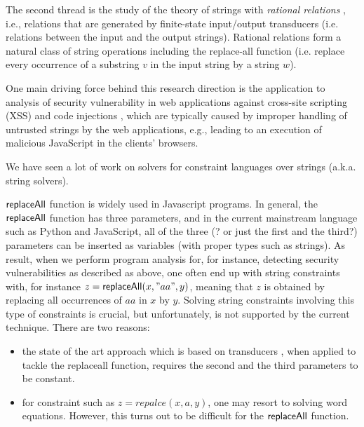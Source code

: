 The second thread
is the study of the theory of strings with \emph{rational relations} \cite{??},
i.e., relations that are generated by finite-state input/output transducers
(i.e. relations between the input and the output strings). Rational relations
form a natural class of string operations including the replace-all function
(i.e. replace every occurrence of a substring $v$ in the input string by a
string $w$). 



One main driving force behind 
this research direction is the application to analysis of security vulnerability
in web applications against cross-site scripting (XSS) and code injections 
\cite{??}, which 
are typically caused by improper handling of untrusted strings by the web 
applications, e.g., leading to an execution of malicious JavaScript in the 
clients' browsers. 

We have seen  a lot of work on solvers for constraint languages over strings (a.k.a. string solvers). 


$\mathsf{replaceAll}$ function is widely used in Javascript programs. In general, the $\mathsf{replaceAll}$ function has three parameters, and in the current mainstream language such as Python and JavaScript, all of the three (? or just the first and the third?) parameters can be inserted as variables (with proper types such as strings). As result, when we perform program analysis for, for instance, detecting security vulnerabilities as described as above, one often end up with string constraints with, for instance $z=\mathsf{replaceAll}(x,"aa", y)$, meaning that $z$ is obtained by replacing all occurrences of $aa$ in $x$ by $y$. Solving string constraints involving this type of constraints is crucial, but unfortunately, is not supported by the current technique. There are two reasons:
\begin{itemize}
	\item the state of the art approach which is based on transducers \cite{LB16}, when applied to tackle the replaceall function, requires the second and the third parameters to be constant. 
	
	\item for constraint such as $z=repalce(x,a,y)$, one may resort to solving word equations. However, this turns out to be difficult for the $\mathsf{replaceAll}$ function.   
\end{itemize}

 



\cite{LB16,TCJ16,YABI14}

